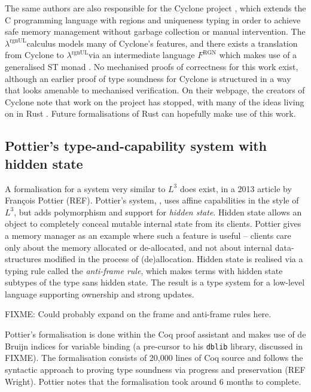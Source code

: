 \documentclass[]{unswthesis}
\newcommand{\rgnUL}{$\lambda^\text{rgnUL}$\text{ }}
\newcommand{\SSPHS}{\text{SSPHS }}
\begin{document}
The same authors are also responsible for the Cyclone project \cite{grossman05}, which extends the C programming language with regions and uniqueness typing in order to achieve safe memory management without garbage collection or manual intervention. The \rgnUL calculus models many of Cyclone's features, and there exists a translation from Cyclone to \rgnUL via an intermediate language $F^\text{RGN}$ which makes use of a generalised ST monad \cite{fluet04}. No mechanised proofs of correctness for this work exist, although an earlier proof of type soundness for Cyclone \cite{jim01} is structured in a way that looks amenable to mechanised verification. On their webpage, the creators of Cyclone note that work on the project has stopped, with many of the ideas living on in Rust \cite{cycloneWeb}. Future formalisations of Rust can hopefully make use of this work.

\subsection{Pottier's type-and-capability system with hidden state}

A formalisation for a system very similar to $L^3$ does exist, in a 2013 article by Fran\c{c}ois Pottier (REF). Pottier's system, \SSPHS, uses affine capabilities in the style of $L^3$, but adds polymorphism and support for \textit{hidden state}. Hidden state allows an object to completely conceal mutable internal state from its clients. Pottier gives a memory manager as an example where such a feature is useful -- clients care only about the memory allocated or de-allocated, and not about internal data-structures modified in the process of (de)allocation. Hidden state is realised via a typing rule called the \textit{anti-frame rule}, which makes terms with hidden state subtypes of the type sans hidden state. The result is a type system for a low-level language supporting ownership and strong updates.

FIXME: Could probably expand on the frame and anti-frame rules here.

Pottier's formalisation is done within the Coq proof assistant and makes use of de Bruijn indices for variable binding (a pre-cursor to his \texttt{dblib} library, discussed in FIXME). The formalisation consists of 20,000 lines of Coq source and follows the syntactic approach to proving type soundness via progress and preservation (REF Wright). Pottier notes that the formalisation took around 6 months to complete.
\end{document}
